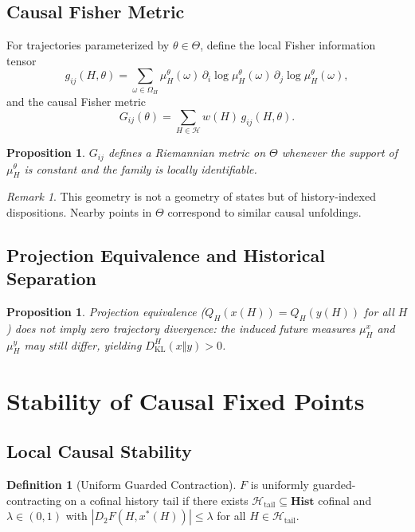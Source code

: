 \documentclass[11pt,a4paper]{article}
\newtheorem{proposition}[theorem]{Proposition}
\theoremstyle{definition}
\newtheorem{definition}[theorem]{Definition}
\theoremstyle{remark}
\newtheorem{remark}[theorem]{Remark}
\begin{document}
\subsection{Causal Fisher Metric}

For trajectories parameterized by $\theta \in \Theta$, define the local Fisher information tensor
\[
g_{ij}(H,\theta) = \sum_{\omega \in \Omega_H} \mu_H^\theta(\omega)\, \partial_i \log \mu_H^\theta(\omega)\, \partial_j \log \mu_H^\theta(\omega),
\]
and the causal Fisher metric
\[
G_{ij}(\theta) = \sum_{H \in \mathcal{H}} w(H)\, g_{ij}(H,\theta).
\]

\begin{proposition}
$G_{ij}$ defines a Riemannian metric on $\Theta$ whenever the support of $\mu_H^\theta$ is constant and the family is locally identifiable.
\end{proposition}

\begin{remark}
This geometry is not a geometry of states but of history-indexed dispositions. Nearby points in $\Theta$ correspond to similar causal unfoldings.
\end{remark}

\subsection{Projection Equivalence and Historical Separation}

\begin{proposition}
Projection equivalence ($Q_H(x(H)) = Q_H(y(H))$ for all $H$) does not imply zero trajectory divergence: the induced future measures $\mu_H^x$ and $\mu_H^y$ may still differ, yielding $D_{\mathrm{KL}}^H(x \Vert y) > 0$.
\end{proposition}

\section{Stability of Causal Fixed Points}

\subsection{Local Causal Stability}

\begin{definition}[Uniform Guarded Contraction]
$F$ is uniformly guarded-contracting on a cofinal history tail if there exists $\mathcal{H}_{\mathrm{tail}} \subseteq \mathbf{Hist}$ cofinal and $\lambda \in (0,1)$ with $|D_2 F(H, x^\ast(H))| \leq \lambda$ for all $H \in \mathcal{H}_{\mathrm{tail}}$.
\end{definition}
\end{document}
